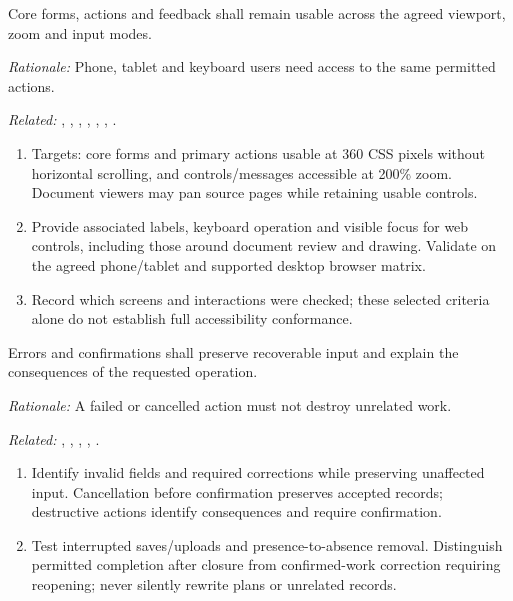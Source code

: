 \label{nfr:USA-08}
Core forms, actions and feedback shall remain usable across the agreed viewport, zoom and input modes.

\textit{Rationale:} Phone, tablet and keyboard users need access to the same permitted actions.

\textit{Related:} \hyperref[fr:024]{}, \hyperref[fr:028]{}, \hyperref[fr:030]{}, \hyperref[fr:036]{}, \hyperref[fr:038]{}, \hyperref[fr:042]{}, \hyperref[fr:055]{}.
\begin{enumerate}[label=(\alph*),leftmargin=*,itemsep=1pt,topsep=3pt]
\item Targets: core forms and primary actions usable at 360 CSS pixels without horizontal scrolling, and controls/messages accessible at 200\% zoom. Document viewers may pan source pages while retaining usable controls.
\item Provide associated labels, keyboard operation and visible focus for web controls, including those around document review and drawing. Validate on the agreed phone/tablet and supported desktop browser matrix.
\item Record which screens and interactions were checked; these selected criteria alone do not establish full accessibility conformance.
\end{enumerate}

\label{nfr:USA-09}
Errors and confirmations shall preserve recoverable input and explain the consequences of the requested operation.

\textit{Rationale:} A failed or cancelled action must not destroy unrelated work.

\textit{Related:} \hyperref[fr:035]{}, \hyperref[fr:036]{}, \hyperref[fr:037]{}, \hyperref[fr:041]{}, \hyperref[fr:043]{}.
\begin{enumerate}[label=(\alph*),leftmargin=*,itemsep=1pt,topsep=3pt]
\item Identify invalid fields and required corrections while preserving unaffected input. Cancellation before confirmation preserves accepted records; destructive actions identify consequences and require confirmation.
\item Test interrupted saves/uploads and presence-to-absence removal. Distinguish permitted completion after closure from confirmed-work correction requiring reopening; never silently rewrite plans or unrelated records.
\end{enumerate}

